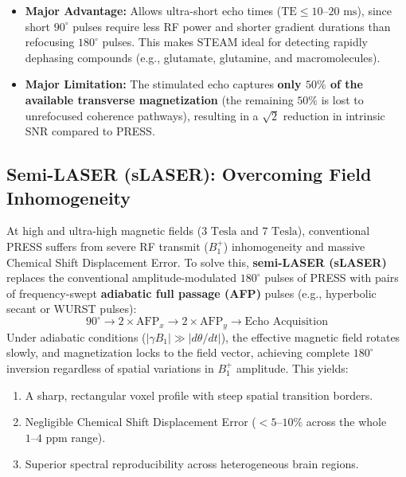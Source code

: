 \documentclass[11pt,a4paper]{article}
\begin{document}
\begin{itemize}[leftmargin=2em]
    \item \textbf{Major Advantage:} Allows ultra-short echo times ($\text{TE} \le 10\text{--}20\text{ ms}$), since short $90^\circ$ pulses require less RF power and shorter gradient durations than refocusing $180^\circ$ pulses. This makes STEAM ideal for detecting rapidly dephasing compounds (e.g., glutamate, glutamine, and macromolecules).
    \item \textbf{Major Limitation:} The stimulated echo captures \textbf{only $50\%$ of the available transverse magnetization} (the remaining $50\%$ is lost to unrefocused coherence pathways), resulting in a $\sqrt{2}$ reduction in intrinsic SNR compared to PRESS.
\end{itemize}

\subsection{Semi-LASER (sLASER): Overcoming Field Inhomogeneity}
At high and ultra-high magnetic fields ($3\text{ Tesla}$ and $7\text{ Tesla}$), conventional PRESS suffers from severe RF transmit ($B_1^+$) inhomogeneity and massive Chemical Shift Displacement Error. To solve this, \textbf{semi-LASER (sLASER)} replaces the conventional amplitude-modulated $180^\circ$ pulses of PRESS with pairs of frequency-swept \textbf{adiabatic full passage (AFP)} pulses (e.g., hyperbolic secant or WURST pulses):
\begin{equation}
    90^\circ \longrightarrow 2 \times \text{AFP}_x \longrightarrow 2 \times \text{AFP}_y \longrightarrow \text{Echo Acquisition}
\end{equation}
Under adiabatic conditions ($|\gamma B_1| \gg |d\theta / dt|$), the effective magnetic field rotates slowly, and magnetization locks to the field vector, achieving complete $180^\circ$ inversion regardless of spatial variations in $B_1^+$ amplitude. This yields:
\begin{enumerate}
    \item A sharp, rectangular voxel profile with steep spatial transition borders.
    \item Negligible Chemical Shift Displacement Error ($< 5\text{--}10\%$ across the whole $1\text{--}4\text{ ppm}$ range).
    \item Superior spectral reproducibility across heterogeneous brain regions.
\end{enumerate}
\end{document}
